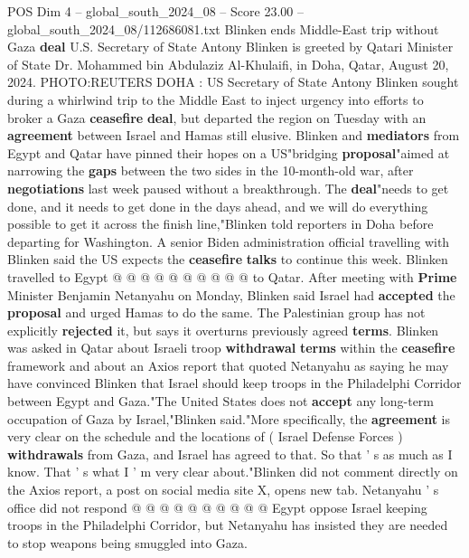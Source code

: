 \begin{textsample}{POS Dim 4 – global\_south\_2024\_08 – Score 23.00 – global\_south\_2024\_08/112686081.txt}  \label{ex:f4_pos_128}
Blinken ends Middle-East trip without Gaza \textbf{deal} U.S.
Secretary of State Antony Blinken is greeted by Qatari Minister of State Dr.
Mohammed bin Abdulaziz Al-Khulaifi, in Doha, Qatar, August 20, 2024.
PHOTO:REUTERS DOHA : US Secretary of State Antony Blinken sought during a whirlwind trip to the Middle East to inject urgency into efforts to broker a Gaza \textbf{ceasefire} \textbf{deal}, but departed the region on Tuesday with an \textbf{agreement} between Israel and Hamas still elusive.
Blinken and \textbf{mediators} from Egypt and Qatar have pinned their hopes on a US"bridging \textbf{proposal}"aimed at narrowing the \textbf{gaps} between the two sides in the 10-month-old war, after \textbf{negotiations} last week paused without a breakthrough.
The \textbf{deal}"needs to get done, and it needs to get done in the days ahead, and we will do everything possible to get it across the finish line,"Blinken told reporters in Doha before departing for Washington.
A senior Biden administration official travelling with Blinken said the US expects the \textbf{ceasefire} \textbf{talks} to continue this week.
Blinken travelled to Egypt @ @ @ @ @ @ @ @ @ @ to Qatar.
After meeting with \textbf{Prime} Minister Benjamin Netanyahu on Monday, Blinken said Israel had \textbf{accepted} the \textbf{proposal} and urged Hamas to do the same.
The Palestinian group has not explicitly \textbf{rejected} it, but says it overturns previously agreed \textbf{terms}.
Blinken was asked in Qatar about Israeli troop \textbf{withdrawal} \textbf{terms} within the \textbf{ceasefire} framework and about an Axios report that quoted Netanyahu as saying he may have convinced Blinken that Israel should keep troops in the Philadelphi Corridor between Egypt and Gaza."The United States does not \textbf{accept} any long-term occupation of Gaza by Israel,"Blinken said."More specifically, the \textbf{agreement} is very clear on the schedule and the locations of ( Israel Defense Forces ) \textbf{withdrawals} from Gaza, and Israel has agreed to that.
So that ' s as much as I know.
That ' s what I ' m very clear about."Blinken did not comment directly on the Axios report, a post on social media site X, opens new tab.
Netanyahu ' s office did not respond @ @ @ @ @ @ @ @ @ @ Egypt oppose Israel keeping troops in the Philadelphi Corridor, but Netanyahu has insisted they are needed to stop weapons being smuggled into Gaza.

\end{textsample}
